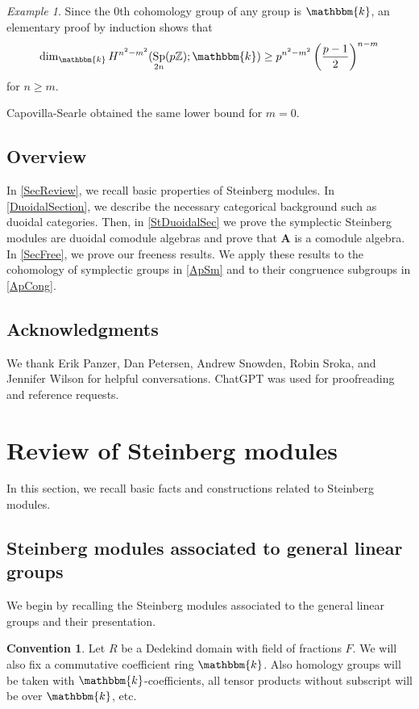 \documentclass[11pt,letterpaper]{amsart}
\newcommand{\bk}{\mathbbm{k}}
\DeclareMathOperator{\Sp}{Sp}
\newcommand{\HA}{\mathbf{A}}
\newcommand{\Z}{\mathbb{Z}}
\numberwithin{theoremcounter}{section}
\theoremstyle{definition}
\newtheorem{convention}[convauto]{Convention}
\theoremstyle{remark}
\newtheorem{example}[exampleauto]{Example}
\begin{document}
\begin{example}
    Since the $0$th cohomology group of any group is $\bk$, an elementary proof by induction shows that
$$\dim_\bk H^{n^2-m^2}(\Sp_{2n}(p \Z );\bk) \geq p^{n^2-m^2}\left(\frac{p-1}{2}\right)^{n-m}$$ for $n \geq m$.
\end{example}

Capovilla-Searle \cite[Corollary C]{Fabio} obtained the same lower bound for $m=0$.

\subsection{Overview} In \autoref{SecReview}, we recall basic properties of Steinberg modules. In \autoref{DuoidalSection}, we describe the necessary categorical background such as duoidal categories. Then, in \autoref{StDuoidalSec} we prove the symplectic Steinberg modules are duoidal comodule algebras and prove that $\HA$ is a comodule algebra. In \autoref{SecFree}, we prove our freeness results. We apply these results to the cohomology of symplectic groups in \autoref{ApSm} and to their congruence subgroups in \autoref{ApCong}.


\subsection{Acknowledgments} We thank Erik Panzer, Dan Petersen, Andrew Snowden, Robin Sroka, and Jennifer Wilson for helpful conversations. ChatGPT was used for proofreading and reference requests. 


\section{Review of Steinberg modules}

In this section, we recall basic facts and constructions related to Steinberg modules.

\label{SecReview}

\subsection{Steinberg modules associated to general linear groups}

We begin by recalling the Steinberg modules associated to the general linear groups and their presentation.

\begin{convention}
  Let $R$ be a Dedekind domain with field of fractions $F$. We will also fix a commutative coefficient ring $\bk$. Also homology groups will be taken with $\bk$-coefficients, all tensor products without subscript will be over $\bk$, etc. 
\end{convention}
\end{document}
